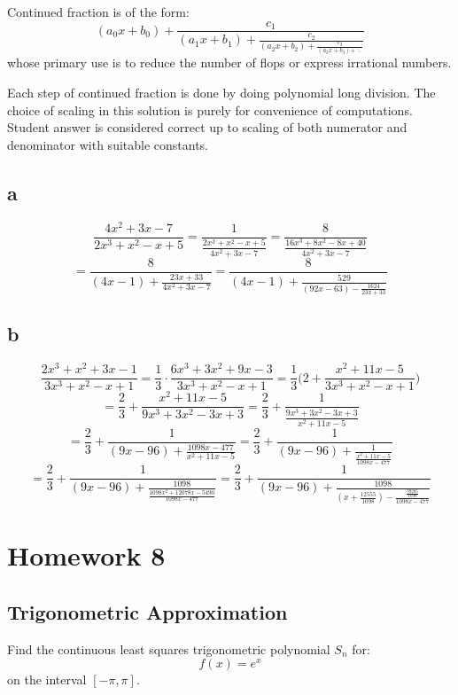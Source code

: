 \documentclass[12pt]{article} %
\newcommand{\1}[1]{\mathds{1}\left[#1\right]}
\begin{document}
\subsubsection{}
Continued fraction is of the form:
$$
	(a_0x+b_0) + \frac{c_1}{(a_1x+b_1) + \frac{c_2}{(a_2x+b_2) + \frac{c_3}{(a_3x+b_3) + \ddots}}}
$$ whose primary use is to reduce the number of flops or express irrational numbers.

Each step of continued fraction is done by doing polynomial long division. The choice of scaling in this solution is purely for convenience of computations. Student answer is considered correct up to scaling of both numerator and denominator with suitable constants. 
\subsection{a}
$$
	\frac{4x^2 + 3x - 7}{2x^3 + x^2 - x + 5} = \frac{1}{\frac{2x^3 + x^2 - x + 5}{4x^2 + 3x - 7}} = \frac{8}{\frac{16x^3 + 8x^2 -8x +40}{4x^2 +3x-7}} 
$$
$$= 
	\frac{8}{(4x-1) + \frac{23x+33}{4x^2+3x-7}} = 
	\frac{8}{(4x-1) + \frac{529}{(92x-63) - \frac{1624}{23x+33}}}
$$

\subsection{b}
$$
	\frac{2x^3+x^2+3x-1}{3x^3+x^2-x+1} = \frac13\cdot\frac{6x^3+3x^2+9x-3}{3x^3+x^2-x+1} = 
	\frac13\bigg(
	2+\frac{x^2+11x-5}{3x^3+x^2-x+1}
	\bigg)
$$
$$
	=\frac23 + \frac{x^2+11x-5}{9x^3+3x^2-3x+3} = \frac23+\frac{1}{\frac{9x^3+3x^2-3x+3}{x^2+11x-5}}
$$
$$
= \frac23+\frac{1}{(9x-96)+\frac{1098x-477}{x^2+11x-5}} = 
\frac23+\frac{1}{(9x-96)+\frac{1}{\frac{x^2+11x-5}{1098x-477}}}
$$
$$
	= \frac23+\frac{1}{(9x-96)+\frac{1098}{\frac{1098x^2+12078x-5490}{1098x-477}}} = \frac23+\frac{1}{(9x-96)+\frac{1098}{(x+\frac{12555}{1098}) - \frac{\frac{39285}{1098}}{1098x-477}}}
$$

\newpage
\section{Homework 8}
\subsection{Trigonometric Approximation}
Find the continuous least squares trigonometric polynomial $S_n$ for:
$$
	f(x) = e^x
$$ on the interval $[-\pi, \pi]$.
\subsubsection{}
\end{document}
